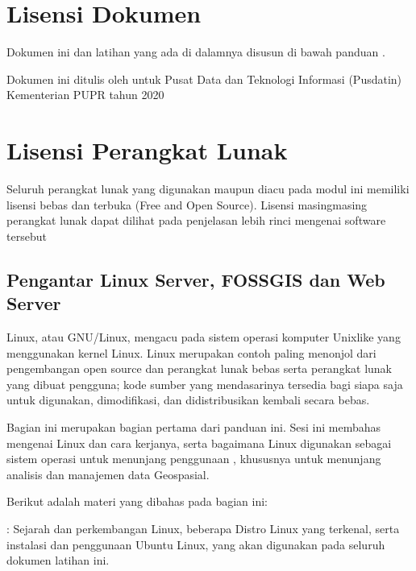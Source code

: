 \documentclass[letterpaper,10pt,english]{sphinxmanual}
\begin{document}
\section{Lisensi Dokumen}
\label{\detokenize{intro:lisensi-dokumen}}
Dokumen ini dan latihan yang ada di dalamnya disusun di bawah panduan .

Dokumen ini ditulis oleh  untuk Pusat Data dan Teknologi Informasi (Pusdatin) Kementerian PUPR tahun 2020


\section{Lisensi Perangkat Lunak}
\label{\detokenize{intro:lisensi-perangkat-lunak}}
Seluruh perangkat lunak yang digunakan maupun diacu pada modul ini memiliki lisensi bebas dan terbuka (Free and Open Source). Lisensi masing\sphinxhyphen{}masing perangkat lunak dapat dilihat pada penjelasan lebih rinci mengenai software tersebut


\subsection{Pengantar Linux Server, FOSS\sphinxhyphen{}GIS dan Web Server}
\label{\detokenize{sesi1/introlinux:pengantar-linux-server-foss-gis-dan-web-server}}\label{\detokenize{sesi1/introlinux::doc}}
Linux, atau GNU/Linux, mengacu pada sistem operasi komputer Unix\sphinxhyphen{}like yang menggunakan kernel Linux. Linux merupakan contoh paling menonjol dari pengembangan open source dan perangkat lunak bebas serta perangkat lunak yang dibuat pengguna; kode sumber yang mendasarinya tersedia bagi siapa saja untuk digunakan, dimodifikasi, dan didistribusikan kembali secara bebas.

Bagian ini merupakan bagian pertama dari panduan ini. Sesi ini membahas mengenai Linux dan cara kerjanya, serta bagaimana Linux digunakan sebagai sistem operasi untuk menunjang penggunaan , khususnya untuk menunjang analisis dan manajemen data Geospasial.

Berikut adalah materi yang dibahas pada bagian ini:

 {\hyperref[\detokenize{sesi1/pengantarlinux::doc}]{}}
: Sejarah dan perkembangan Linux, beberapa Distro Linux yang terkenal, serta instalasi dan penggunaan Ubuntu Linux, yang akan digunakan pada seluruh dokumen latihan ini.
\end{document}
